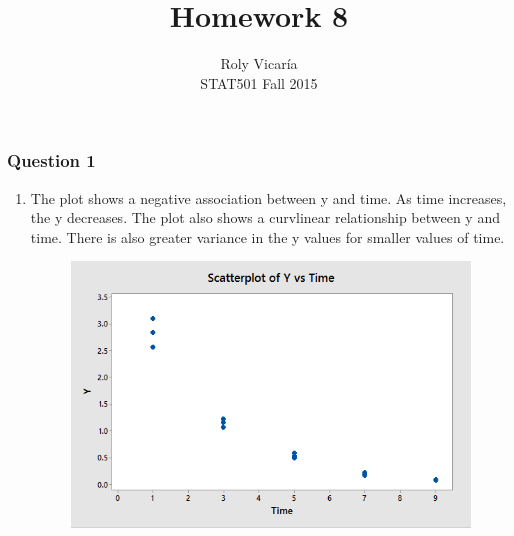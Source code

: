 \documentclass{article}
\title{Homework 8}
\author{Roly Vicar\'ia \\ STAT501 Fall 2015}
\providecommand{\tightlist}{%
      \setlength{\itemsep}{0pt}\setlength{\parskip}{0pt}}
\begin{document}
    
    
    \maketitle
    
    

    
    \subsubsection{Question 1}\label{question-1}

\begin{enumerate}
\def\labelenumi{\alph{enumi})}
\tightlist
\item
  The plot shows a negative association between y and time. As time
increases, the y decreases. The plot also shows a curvlinear
relationship between y and time. There is also greater variance in the y
values for smaller values of time.

  \begin{figure}[h!]
 \centering
 \includegraphics[scale=.5]{./images/scatterplot_y-vs-time.png}
\end{figure}
\end{enumerate}
\end{document}

